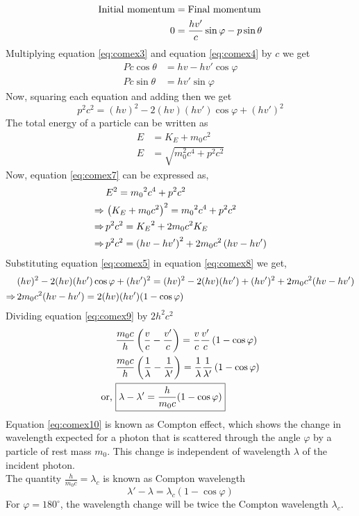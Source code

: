 \documentclass[../main.tex]{subfiles}
\begin{document}
    \begin{align}
        \text{Initial momentum} &= \text{Final momentum}\notag\\
        0& =\frac{hv'}{c}\sin \varphi-p\sin\theta \label{eq:comex4}
    \end{align}
    Multiplying equation \eqref{eq:comex3} and equation \eqref{eq:comex4} by $ c $ we get 
    \begin{align*}
        Pc \cos \theta&=hv-hv'\cos\varphi\\
        Pc \sin \theta&=hv'\sin\varphi
    \end{align*}
    Now, squaring each equation and adding then we get
    \begin{equation}
        p^2c^2=(hv)^2-2(hv)(hv')\cos\varphi+(hv')^2\label{eq:comex5}
    \end{equation}
    The total energy of a particle can be written as 
    \begin{align}
        E&=K_E+m_0c^2\label{eq:comex6}\\
        E&=\sqrt{{m_0^2}c^4+p^2c^2}\label{eq:comex7}
    \end{align}
    Now, equation \eqref{eq:comex7} can be expressed as,
    \begin{align}
        &E^2={m_0}^2c^4+p^2c^2\notag\\
        \Rightarrow\,&\left( K_E+m_0c^2 \right)^2={m_0}^2c^4+p^2c^2\notag\\
        \Rightarrow\,&p^2c^2={K_E}^2+2{m_0}c^2K_E\notag\\
        \Rightarrow\,&p^2c^2=\left( hv-hv' \right)^2+2{m_0}c^2\left( hv-hv' \right)\label{eq:comex8}
    \end{align}
    Substituting equation \eqref{eq:comex5} in equation \eqref{eq:comex8} we get,
    \begin{align}
        &(hv)^2-2(hv)(hv')\cos\varphi+(hv')^2=(hv)^2-2(hv)(hv')+(hv')^2+2m_0c^2(hv-hv')\notag\\
        \Rightarrow\,&2m_0c^2(hv-hv')=2(hv)(hv')(1-\cos\varphi)\label{eq:comex9}
    \end{align}
    Dividing equation \eqref{eq:comex9} by $ 2h^2c^2 $
    \begin{align}
        &\frac{m_0c}{h}\left( \frac{v}{c}-\frac{v'}{c} \right)=\frac{v}{c}\frac{v'}{c}\left( 1-\cos\varphi \right)\notag\\
        &\frac{m_0c}{h}\left( \frac{1}{\lambda}-\frac{1}{\lambda'} \right)=\frac{1}{\lambda}\frac{1}{\lambda'}\left( 1-\cos\varphi \right)\notag\\
        \text{or, }&\boxed{\lambda-\lambda'=\frac{h}{m_0c}(1-\cos\varphi)}\label{eq:comex10}
    \end{align}
    Equation \eqref{eq:comex10} is known as Compton effect, which shows the change in wavelength expected for a photon that is scattered through the angle $ \varphi  $ by a particle of rest mass $ m_0 $. This change is independent of wavelength $ \lambda $ of the incident photon.\\
    The quantity $ \frac{h}{m_0c}=\lambda_c $ is known as Compton wavelength
    \[\lambda'-\lambda=\lambda_c(1-\cos\varphi)\]
    For $ \varphi=180^\circ $, the wavelength change will be twice the Compton wavelength $ \lambda_c $.
\end{document}
